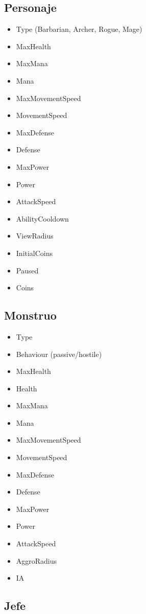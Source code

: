 \subsection{Personaje}
\begin{itemize}
    \item Type (Barbarian, Archer, Rogue, Mage)
    \item MaxHealth
    \item MaxMana
    \item Mana
    \item MaxMovementSpeed
    \item MovementSpeed
    \item MaxDefense
    \item Defense
    \item MaxPower
    \item Power
    \item AttackSpeed
    \item AbilityCooldown
    \item ViewRadius
    \item InitialCoins
    \item Paused
    \item Coins
\end{itemize}

\subsection{Monstruo}
\begin{itemize}
    \item Type
    \item Behaviour (passive/hostile)
    \item MaxHealth
    \item Health
    \item MaxMana
    \item Mana
    \item MaxMovementSpeed
    \item MovementSpeed
    \item MaxDefense
    \item Defense
    \item MaxPower
    \item Power
    \item AttackSpeed
    \item AggroRadius
    \item IA
\end{itemize}

\subsection{Jefe}


